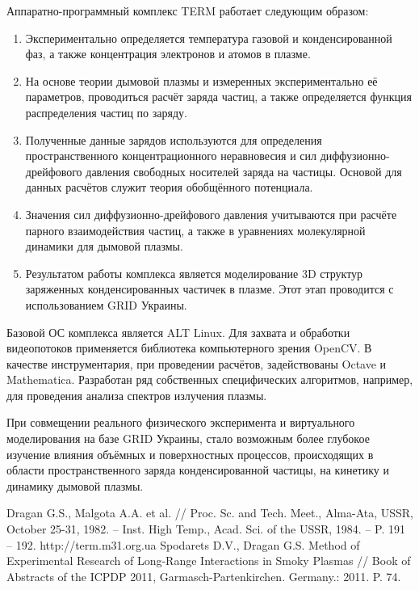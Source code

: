 \documentclass[10pt, a5paper]{article}
\begin{document}
Аппаратно-программный комплекс TERM работает следующим образом:
\begin{enumerate}
	\item Экспериментально определяется температура газовой и конденсированной фаз, а также концентрация электронов и атомов в плазме.
	\item На основе теории дымовой плазмы и измеренных экспериментально её параметров, проводиться расчёт заряда частиц, а также определяется функция распределения частиц по заряду.
	\item Полученные данные зарядов используются для определения пространственного концентрационного неравновесия и сил \linebreak диффузионно-дрейфового давления свободных носителей заряда на частицы. Основой для данных расчётов служит теория обобщённого потенциала.
	\item Значения сил диффузионно-дрейфового давления учитываются при  расчёте парного взаимодействия частиц, а также в уравнениях молекулярной динамики для дымовой плазмы.
	\item Результатом работы комплекса является моделирование 3D структур заряженных конденсированных частичек в плазме. Этот этап проводится с использованием GRID Украины.
\end{enumerate}
Базовой ОС комплекса является ALT Linux. Для захвата и обработки видеопотоков применяется библиотека компьютерного зрения OpenCV. В качестве инструментария, при проведении расчётов, задействованы Octave и Mathematica. Разработан ряд собственных специфических алгоритмов, например, для проведения анализа спектров излучения плазмы. 

При совмещении реального физического эксперимента и виртуального моделирования на базе GRID Украины, стало возможным более глубокое изучение влияния объёмных и поверхностных процессов, происходящих в области пространственного заряда конденсированной частицы, на кинетику и динамику дымовой плазмы.
\begin{thebibliography}{9}
	Dragan G.S., Malgota A.A. et al. // Proc. Sc. and Tech. Meet., Alma-Ata, USSR, October 25-31, 1982. – Inst. High Temp., Acad. Sci. of the USSR, 1984. – P. 191 – 192. 
	 http://term.m31.org.ua
	 Spodarets D.V., Dragan G.S. Method of Experimental Research of Long-Range Interactions in Smoky Plasmas // Book of Abstracts of the ICPDP 2011, Garmasch-Partenkirchen. Germany.: 2011. P. 74. 
\end{thebibliography}
\end{document}
